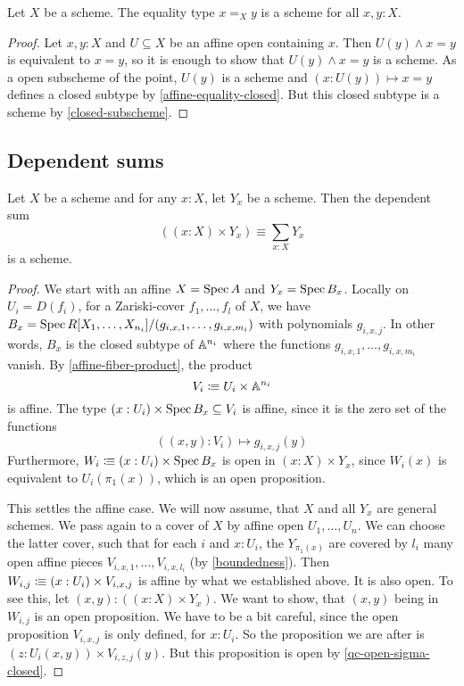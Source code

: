 \begin{proposition}%
  \label{equality-scheme}
  Let $X$ be a scheme.
  The equality type $x=_Xy$ is a scheme for all $x,y:X$.
\end{proposition}

\begin{proof}
  Let $x,y:X$ and
  $U\subseteq X$ be an affine open containing $x$.
  Then $U(y)\wedge x=y$ is equivalent to $x=y$, so it is enough to show that $U(y)\wedge x=y$ is a scheme.
  As a open subscheme of the point, $U(y)$ is a scheme and $(x:U(y))\mapsto x=y$ defines a closed subtype by \cref{affine-equality-closed}.
  But this closed subtype is a scheme by \cref{closed-subscheme}.
\end{proof}

\subsection{Dependent sums}

\begin{theorem}%
  \label{sigma-scheme}
  Let $X$ be a scheme and for any $x:X$, let $Y_x$ be a scheme.
  Then the dependent sum
  \[ \left((x:X)\times Y_x\right)\equiv \sum_{x:X}Y_x\]
  is a scheme.
\end{theorem}

\begin{proof}
  We start with an affine $X=\operatorname{Spec} A$ and $Y_x=\operatorname{Spec} B_x$.
  Locally on $U_i = D(f_i)$, for a Zariski-cover $f_1,\dots,f_l$ of $X$,
  we have $B_x=\operatorname{Spec} R[X_1,\dots,X_{n_i}]/(g_{i,x,1},\dots,g_{i,x,m_i})$
  with polynomials $g_{i,x,j}$.
  In other words, $B_x$ is the closed subtype of $\mathbb{A}^{n_i}$
  where the functions $g_{i,x,1},\dots,g_{i,x,m_i}$ vanish.
  By \cref{affine-fiber-product}, the product
  \[ V_i\vcentcolon\mspace{-1.2mu}\equiv U_i\times \mathbb{A}^{n_i}\]
  is affine.
  The type $(x:U_i)\times \operatorname{Spec} B_x\subseteq V_i$ is affine,
  since it is the zero set of the functions
  \[ ((x,y):V_i)\mapsto g_{i,x,j}(y) \]
  Furthermore, $W_i\vcentcolon\mspace{-1.2mu}\equiv (x:U_i)\times \operatorname{Spec} B_x$
  is open in $(x:X)\times Y_x$,
  since $W_i(x)$ is equivalent to $U_i(\pi_1(x))$,
  which is an open proposition.

  This settles the affine case.
  We will now assume, that
  $X$ and all $Y_x$ are general schemes.
  We pass again to a cover of $X$ by affine open $U_1,\dots,U_n$.
  We can choose the latter cover,
  such that for each $i$ and $x:U_i$, the $Y_{\pi_1(x)}$
  are covered by $l_i$ many open affine pieces $V_{i,x,1},\dots,V_{i,x,l_i}$
  (by \cref{boundedness}).
  Then $W_{i,j}\vcentcolon\mspace{-1.2mu}\equiv(x:U_i)\times V_{i,x,j}$ is affine by what we established above.
  It is also open.
  To see this, let $(x,y):((x:X)\times Y_x)$.
  We want to show, that $(x,y)$ being in $W_{i,j}$ is an open proposition.
  We have to be a bit careful, since the open proposition
  $V_{i,x,j}$ is only defined, for $x:U_i$.
  So the proposition we are after is $(z:U_i(x,y))\times V_{i,z,j}(y)$.
  But this proposition is open by \cref{qc-open-sigma-closed}.
\end{proof}

